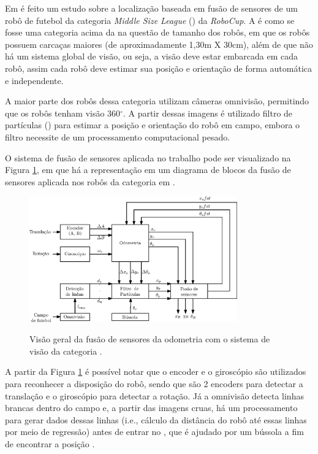 \documentclass[acronym, symbols, table]{fei}
\begin{document}
Em \textcite{ismail2022soccer} é feito um estudo sobre a localização baseada em fusão de sensores de um robô de futebol da categoria \textit{Middle Size League} () da \textit{RoboCup}. A  é como se fosse uma categoria acima da  na questão de tamanho dos robôs, em que os robôs possuem carcaças maiores (de aproximadamente 1,30m X 30cm), além de que não há um sistema global de visão, ou seja, a visão deve estar embarcada em cada robô, assim cada robô deve estimar sua posição e orientação de forma automática e independente.

A maior parte dos robôs dessa categoria utilizam câmeras omnivisão, permitindo que os robôs tenham visão 360$^\circ$. A partir dessas imagens é utilizado filtro de partículas () para estimar a posição e orientação do robô em campo, embora o filtro necessite de um processamento computacional pesado.

O sistema de fusão de sensores aplicada no trabalho pode ser visualizado na Figura \ref{fig:msl_sensor_fusion}, em que há a representação em um diagrama de blocos da fusão de sensores aplicada nos robôs da categoria  em \textcite{ismail2022soccer}.

\begin{figure}[!htb]
	\centering
	\caption{Visão geral da fusão de sensores da odometria com o sistema de visão da categoria .} 
	\includegraphics[width=0.8\textwidth]{msl_sensor_fusion.eps}
	\label{fig:msl_sensor_fusion}
\end{figure}

A partir da Figura \ref{fig:msl_sensor_fusion} é possível notar que o encoder e o giroscópio são utilizados para reconhecer a disposição do robô, sendo que são 2 encoders para detectar a translação e o giroscópio para detectar a rotação. Já a omnivisão detecta linhas brancas dentro do campo e, a partir das imagens cruas, há um processamento para gerar dados dessas linhas (i.e., cálculo da distância do robô até essas linhas por meio de regressão) antes de entrar no , que é ajudado por um bússola a fim de encontrar a posição .
\end{document}
